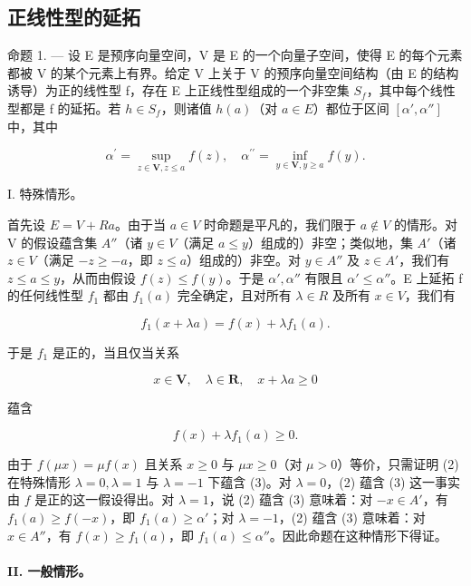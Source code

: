 \subsection{正线性型的延拓}

命题 1. --- 设 E 是预序向量空间，V 是 E 的一个向量子空间，使得 E 的每个元素都被 V 的某个元素上有界。给定 V 上关于 V 的预序向量空间结构（由 E 的结构诱导）为正的线性型 f，存在 E 上正线性型组成的一个非空集 \(S_{f}\)，其中每个线性型都是 f 的延拓。若 \(h \in S_{f}\)，则诸值 \(h(a)\)（对 \(a \in E\)）都位于区间 \([\alpha', \alpha'']\) 中，其中

\[
\alpha^ {\prime} = \sup _ {z \in \mathbf {V}, z \leqslant a} f (z), \quad \alpha^ {\prime \prime} = \inf _ {y \in \mathbf {V}, y \geqslant a} f (y).\tag{1}
\]

I. 特殊情形。

首先设 \(E = V + R a\)。由于当 \(a \in V\) 时命题是平凡的，我们限于 \(a \notin V\) 的情形。对 V 的假设蕴含集 \(A''\)（诸 \(y \in V\)（满足 \(a \leqslant y\)）组成的）非空；类似地，集 \(A'\)（诸 \(z \in V\)（满足 \(-z \geqslant -a\)，即 \(z \leqslant a\)）组成的）非空。对 \(y \in A''\) 及 \(z \in A'\)，我们有 \(z \leqslant a \leqslant y\)，从而由假设 \(f(z) \leqslant f(y)\)。于是 \(\alpha', \alpha''\) 有限且 \(\alpha' \leqslant \alpha''\)。E 上延拓 f 的任何线性型 \(f_1\) 都由 \(f_1(a)\) 完全确定，且对所有 \(\lambda \in R\) 及所有 \(x \in V\)，我们有

\[
f _ {1} (x + \lambda a) = f (x) + \lambda f _ {1} (a).
\]

于是 \(f_{1}\) 是正的，当且仅当关系

\[
x \in \mathbf {V}, \quad \lambda \in \mathbf {R}, \quad x + \lambda a \geqslant 0\tag{2}
\]

蕴含

\[
f (x) + \lambda f _ {1} (a) \geqslant 0.\tag{3}
\]

由于 \(f(\mu x) = \mu f(x)\) 且关系 \(x \geqslant 0\) 与 \(\mu x \geqslant 0\)（对 \(\mu > 0\)）等价，只需证明 (2) 在特殊情形 \(\lambda = 0, \lambda = 1\) 与 \(\lambda = -1\) 下蕴含 (3)。对 \(\lambda = 0\)，(2) 蕴含 (3) 这一事实由 \(f\) 是正的这一假设得出。对 \(\lambda = 1\)，说 (2) 蕴含 (3) 意味着：对 \(-x \in A'\)，有 \(f_1(a) \geqslant f(-x)\)，即 \(f_1(a) \geqslant \alpha'\)；对 \(\lambda = -1\)，(2) 蕴含 (3) 意味着：对 \(x \in A''\)，有 \(f(x) \geqslant f_1(a)\)，即 \(f_1(a) \leqslant \alpha''\)。因此命题在这种情形下得证。

\paragraph{II. 一般情形。}

